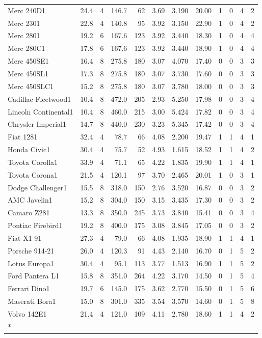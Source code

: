 \documentclass[a4paper, nobind]{templates/ociamthesis}
\begin{document}
\begin{scriptsize}
\begin{longtable}{lrrrrrrrrrrr}
Merc 240D1 & 24.4 & 4 & 146.7 & 62 & 3.69 & 3.190 & 20.00 & 1 & 0 & 4 & 2\\
\addlinespace
Merc 2301 & 22.8 & 4 & 140.8 & 95 & 3.92 & 3.150 & 22.90 & 1 & 0 & 4 & 2\\
Merc 2801 & 19.2 & 6 & 167.6 & 123 & 3.92 & 3.440 & 18.30 & 1 & 0 & 4 & 4\\
Merc 280C1 & 17.8 & 6 & 167.6 & 123 & 3.92 & 3.440 & 18.90 & 1 & 0 & 4 & 4\\
Merc 450SE1 & 16.4 & 8 & 275.8 & 180 & 3.07 & 4.070 & 17.40 & 0 & 0 & 3 & 3\\
Merc 450SL1 & 17.3 & 8 & 275.8 & 180 & 3.07 & 3.730 & 17.60 & 0 & 0 & 3 & 3\\
\addlinespace
Merc 450SLC1 & 15.2 & 8 & 275.8 & 180 & 3.07 & 3.780 & 18.00 & 0 & 0 & 3 & 3\\
Cadillac Fleetwood1 & 10.4 & 8 & 472.0 & 205 & 2.93 & 5.250 & 17.98 & 0 & 0 & 3 & 4\\
Lincoln Continental1 & 10.4 & 8 & 460.0 & 215 & 3.00 & 5.424 & 17.82 & 0 & 0 & 3 & 4\\
Chrysler Imperial1 & 14.7 & 8 & 440.0 & 230 & 3.23 & 5.345 & 17.42 & 0 & 0 & 3 & 4\\
Fiat 1281 & 32.4 & 4 & 78.7 & 66 & 4.08 & 2.200 & 19.47 & 1 & 1 & 4 & 1\\
\addlinespace
Honda Civic1 & 30.4 & 4 & 75.7 & 52 & 4.93 & 1.615 & 18.52 & 1 & 1 & 4 & 2\\
Toyota Corolla1 & 33.9 & 4 & 71.1 & 65 & 4.22 & 1.835 & 19.90 & 1 & 1 & 4 & 1\\
Toyota Corona1 & 21.5 & 4 & 120.1 & 97 & 3.70 & 2.465 & 20.01 & 1 & 0 & 3 & 1\\
Dodge Challenger1 & 15.5 & 8 & 318.0 & 150 & 2.76 & 3.520 & 16.87 & 0 & 0 & 3 & 2\\
AMC Javelin1 & 15.2 & 8 & 304.0 & 150 & 3.15 & 3.435 & 17.30 & 0 & 0 & 3 & 2\\
\addlinespace
Camaro Z281 & 13.3 & 8 & 350.0 & 245 & 3.73 & 3.840 & 15.41 & 0 & 0 & 3 & 4\\
Pontiac Firebird1 & 19.2 & 8 & 400.0 & 175 & 3.08 & 3.845 & 17.05 & 0 & 0 & 3 & 2\\
Fiat X1-91 & 27.3 & 4 & 79.0 & 66 & 4.08 & 1.935 & 18.90 & 1 & 1 & 4 & 1\\
Porsche 914-21 & 26.0 & 4 & 120.3 & 91 & 4.43 & 2.140 & 16.70 & 0 & 1 & 5 & 2\\
Lotus Europa1 & 30.4 & 4 & 95.1 & 113 & 3.77 & 1.513 & 16.90 & 1 & 1 & 5 & 2\\
\addlinespace
Ford Pantera L1 & 15.8 & 8 & 351.0 & 264 & 4.22 & 3.170 & 14.50 & 0 & 1 & 5 & 4\\
Ferrari Dino1 & 19.7 & 6 & 145.0 & 175 & 3.62 & 2.770 & 15.50 & 0 & 1 & 5 & 6\\
Maserati Bora1 & 15.0 & 8 & 301.0 & 335 & 3.54 & 3.570 & 14.60 & 0 & 1 & 5 & 8\\
Volvo 142E1 & 21.4 & 4 & 121.0 & 109 & 4.11 & 2.780 & 18.60 & 1 & 1 & 4 & 2\\*
\end{longtable}
\end{scriptsize}
\end{document}
